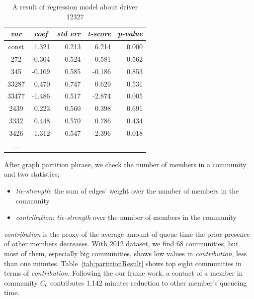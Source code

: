\documentclass{article}
\begin{document}
\begin{table}[h]
	\caption{A result of regression model about driver 12327}
	\vspace{-0.3 cm}
	\begin{center}
		\begin{tabular}{c|rrrr}
		  	\emph{var} 	& \multicolumn{1}{c}{\emph{coef} }	& \multicolumn{1}{c}{\emph{std err}}	& \multicolumn{1}{c}{\emph{t-score}}	& \multicolumn{1}{c}{\emph{p-value}} \\
		  \hline
			const 	& 1.321 	& 0.213 	& 6.214 	& 0.000 \\
			272 		& -0.304 	& 0.524 	& -0.581 	& 0.562 \\
			345 		& -0.109 	& 0.585 	& -0.186 	& 0.853 \\
			33287 	& 0.470 	& 0.747 	& 0.629 	& 0.531 \\
			33477 	& -1.486 	& 0.517 	& -2.874 	& 0.005 \\
			2439 	& 0.223 	& 0.560 	& 0.398 	& 0.691 \\
			3332 	& 0.448 	& 0.570 	& 0.786 	& 0.434 \\
			3426 	& -1.312 	& 0.547 	& -2.396 	& 0.018 \\
			...			&				&				&				&		
		\end{tabular}
	\label{tab:resultInfluenceRegression}
	\end{center}
	\vspace{-0.3 cm}
\end{table}

After graph partition phrase, we check the number of members in a community and two statistics; 

\begin{itemize}
	\item \emph{tie-strength}: the sum of edges' weight over the number of members in the community
	\item \emph{contribution}: \emph{tie-strength} over the number of members in the community
\end{itemize}

\noindent \emph{contribution} is the proxy of the average amount of queue time the prior presence of other members decreases. With 2012 dataset, we find 68 communities, but most of them, especially big communities, shows low values in \emph{contribution}, less than one minutes. Table~\ref{tab:partitionResult} shows top eight communities in terms of \emph{contribution}. Following the our frame work, a contact of a member in community $C_6$ contributes 1.142 minutes reduction to other member's queueing time.
\end{document}

